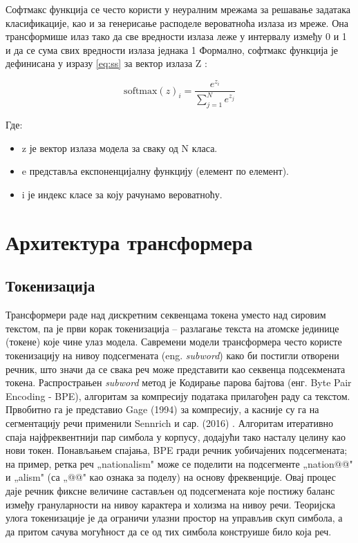 Софтмакс функција се често користи у неуралним мрежама за решавање задатака класификације, као и за генерисање расподеле вероватноћа излаза из мреже. 
Она трансформише илаз тако да све вредности излаза леже у интервалу између 0 и 1 и да се сума свих вредности излаза једнака 1 
Формално, софтмакс функција је дефинисана у изразу \ref{eq:ss} за вектор излаза Z :

\begin{equation}
    \label{eq:ss}
    \text{softmax}(z)_i = \frac{e^{z_i}}{\sum_{j=1}^{N} e^{z_j}}
\end{equation}

Где:

\begin{itemize}
    \item z је вектор излаза модела за сваку од N класа.
    \item e представља експоненцијалну функцију (елемент по елемент).
    \item i је индекс класе за коју рачунамо вероватноћу.
\end{itemize}

\section{Архитектура трансформера}
\label{sec:transformer}

\subsection{Токенизација}

Трансформери раде над дискретним секвенцама токена уместо над сировим текстом, па је први корак токенизација -- разлагање текста на атомске јединице (токене) које чине улаз модела. Савремени модели трансформера често користе токенизацију на нивоу подсегмената (eng. \textit{subword}) како би постигли отворени речник, што значи да се свака реч може представити као секвенца подсекмената токена. Распрострањен \textit{subword} метод је Кодирање парова бајтова (енг. Byte Pair Encoding - BPE), алгоритам за компресију података прилагођен раду са текстом. Првобитно га је представио Gage (1994) за компресију, а касније су га на сегментацију речи применили Sennrich и сар. (2016) \cite{gage_new_1994,sennrich_neural_2016}. Алгоритам итеративно спаја најфреквентнији пар симбола у корпусу, додајући тако насталу целину као нови токен. Понављањем спајања, BPE гради речник уобичајених подсегмената; на пример, ретка реч „nationalism" може се поделити на подсегменте „nation@@" и „alism" (са „@@" као ознака за поделу) на основу фреквенције. Овај процес даје речник фиксне величине састављен од подсегмената које постижу баланс између грануларности на нивоу карактера и холизма на нивоу речи. Теоријска улога токенизације је да ограничи улазни простор на управљив скуп симбола, а да притом сачува могућност да се од тих симбола конструише било која реч.

